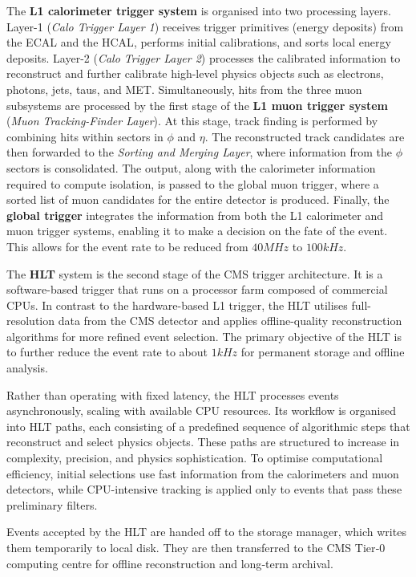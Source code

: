 The \textbf{\ac{L1} calorimeter trigger system} is organised into two processing layers. Layer-1 (\textit{Calo Trigger Layer 1}) receives trigger primitives (energy deposits) from the \ac{ECAL} and the \ac{HCAL}, performs initial calibrations, and sorts local energy deposits. Layer-2 (\textit{Calo Trigger Layer 2}) processes the calibrated information to reconstruct and further calibrate high-level physics objects such as electrons, photons, jets, taus, and \ac{MET}. Simultaneously, hits from the three muon subsystems are processed by the first stage of the \textbf{\ac{L1} muon trigger system} (\textit{Muon Tracking-Finder Layer}). At this stage, track finding is performed by combining hits within sectors in $\phi$ and $\eta$. The reconstructed track candidates are then forwarded to the \textit{Sorting and Merging Layer}, where information from the $\phi$ sectors is consolidated. The output, along with the calorimeter information required to compute isolation, is passed to the global muon trigger, where a sorted list of muon candidates for the entire detector is produced. Finally, the \textbf{global trigger} integrates the information from both the \ac{L1} calorimeter and muon trigger systems, enabling it to make a decision on the fate of the event. This allows for the event rate to be reduced from $40\unit{MHz}$ to $100\unit{kHz}$.

The \textbf{\ac{HLT}} system is the second stage of the \ac{CMS} trigger architecture. It is a software-based trigger that runs on a processor farm composed of commercial CPUs. In contrast to the hardware-based \ac{L1} trigger, the \ac{HLT} utilises full-resolution data from the \ac{CMS} detector and applies offline-quality reconstruction algorithms for more refined event selection. The primary objective of the \ac{HLT} is to further reduce the event rate to about $1\unit{kHz}$ for permanent storage and offline analysis. 

Rather than operating with fixed latency, the \ac{HLT} processes events asynchronously, scaling with available CPU resources. Its workflow is organised into \ac{HLT} paths, each consisting of a predefined sequence of algorithmic steps that reconstruct and select physics objects. These paths are structured to increase in complexity, precision, and physics sophistication. To optimise computational efficiency, initial selections use fast information from the calorimeters and muon detectors, while CPU-intensive tracking is applied only to events that pass these preliminary filters. 

Events accepted by the \ac{HLT} are handed off to the storage manager, which writes them temporarily to local disk. They are then transferred to the \ac{CMS} Tier‑0 computing centre for offline reconstruction and long‑term archival.


